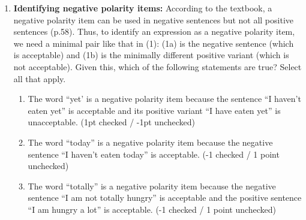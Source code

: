 \documentclass[a4,11pt]{article}
\begin{document}
\begin{enumerate}[leftmargin = 12pt]
      \begin{enumerate}[noitemsep]
        \item The set of white dogs is a proper subset of the set of dogs.
        \item The set of cats is a superset of the set of mice.
	\item The intersection of the set of cats with the set of dogs is empty.
	\item The set of cats is a superset of the set of sleeping cats.
	\item The union of the set of white cats and the set of non-white cats is the set of cats.
	\item The intersection of the set of dogs and the set of black dogs is the set of black dogs.
         \end{enumerate}

 {\bf Model answer:} The following statements are true: (a), (c), (d), (e) and (f).
 
 The statement in (b) is false: in order for it to be true, every mouse would have to be an element of the set of cats. 
  
  \item {\bf Identifying negative polarity items:} According to the textbook, a negative polarity item can be used in negative sentences but not all positive sentences (p.58). Thus, to identify an expression as a negative polarity item, we need a minimal pair like that in (1): (1a) is the negative sentence (which is acceptable) and (1b) is the minimally different positive variant (which is not acceptable). Given this, which of the following statements are true? Select all that apply.
  
         \begin{enumerate}[noitemsep]

       \item The word ``yet' is a negative polarity item because the sentence ``I haven't eaten yet'' is acceptable and its positive variant  ``I have eaten yet'' is unacceptable. (1pt checked / -1pt unchecked)

       \item The word ``today'' is a negative polarity item because the negative sentence ``I haven't eaten today'' is acceptable. (-1 checked / 1 point unchecked)
              
       \item The word ``totally'' is a negative polarity item because the negative sentence ``I am not totally hungry'' is acceptable and the positive sentence ``I am hungry a lot'' is acceptable. (-1 checked / 1 point unchecked)


\end{enumerate}
\end{enumerate}
\end{document}
